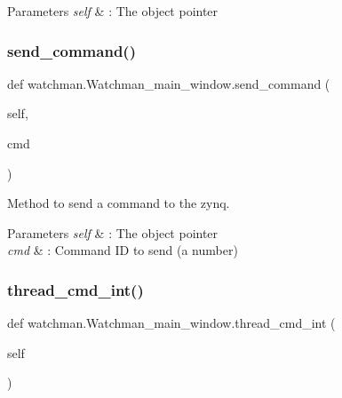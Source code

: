 \begin{DoxyParams}{Parameters}
{\em self} & \+: The object pointer \\
\hline
\end{DoxyParams}
\mbox{\label{classwatchman_1_1_watchman__main__window_a90ee7e25dde8f15c709b9a9c8fd4dbde}} 
\subsubsection{\texorpdfstring{send\_command()}{send\_command()}}
{\footnotesize\ttfamily def watchman.\+Watchman\+\_\+main\+\_\+window.\+send\+\_\+command (\begin{DoxyParamCaption}\item[{}]{self,  }\item[{}]{cmd }\end{DoxyParamCaption})}



Method to send a command to the zynq. 


\begin{DoxyParams}{Parameters}
{\em self} & \+: The object pointer \\
\hline
{\em cmd} & \+: Command ID to send (a number) \\
\hline
\end{DoxyParams}
\mbox{\label{classwatchman_1_1_watchman__main__window_a05f6463320989b4c77eced835775d8ad}} 
\subsubsection{\texorpdfstring{thread\_cmd\_int()}{thread\_cmd\_int()}}
{\footnotesize\ttfamily def watchman.\+Watchman\+\_\+main\+\_\+window.\+thread\+\_\+cmd\+\_\+int (\begin{DoxyParamCaption}\item[{}]{self }\end{DoxyParamCaption})}



